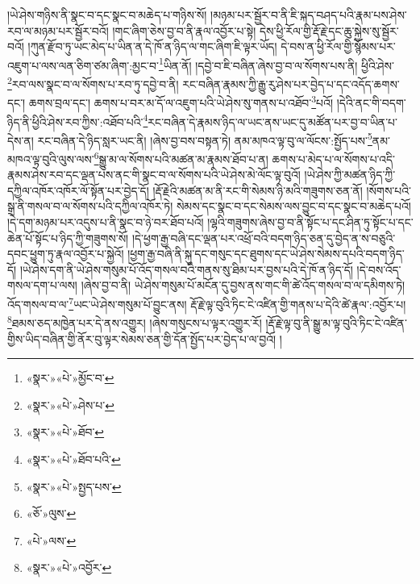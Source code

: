 །ཡེ་ཤེས་གཉིས་ནི་སྣང་བ་དང་སྣང་བ་མཆེད་པ་གཉིས་སོ། །མཉམ་པར་སྦྱོར་བ་ནི་ཇི་སྐད་བཤད་པའི་རྣམ་པས་ཤེས་རབ་ལ་མཉམ་པར་སྦྱོར་བའོ། །གང་ཞིག་ཅེས་བྱ་བ་ནི་རྣལ་འབྱོར་པ་སྟེ། དེས་ཕྱི་རོལ་གྱི་རྡོ་རྗེ་དང་ཆུ་སྐྱེས་སུ་སྦྱོར་བའོ། །ཀུན་རྫོབ་ཏུ་ཡང་མེད་པ་ཡིན་ན་དེ་ཁོ་ན་ཉིད་ལ་གང་ཞིག་ཇི་ལྟར་ཡོད། དེ་བས་ན་ཕྱི་རོལ་གྱི་སྙོམས་པར་འཇུག་པ་ལས་ལན་ཅིག་ཙམ་ཞིག་:མྱང་བ་\footnote{«སྣར་»«པེ་»མྱོང་བ་}ཡིན་ནོ། །དབྱེ་བ་ཇི་བཞིན་ཞེས་བྱ་བ་ལ་སོགས་པས་ནི། ཕྱིའི་ཤེས་\footnote{«སྣར་»«པེ་»ཤེས་པ་}རབ་ལས་སྣང་བ་ལ་སོགས་པ་རབ་ཏུ་དབྱེ་བ་ནི། རང་བཞིན་རྣམས་ཀྱི་རྒྱུ་རུ་ཤེས་པར་བྱེད་པ་དང་འདོད་ཆགས་དང་། ཆགས་བྲལ་དང་། ཆགས་པ་བར་མ་དོ་ལ་འཇུག་པའི་ཡེ་ཤེས་སུ་གནས་པ་འཐོབ་\footnote{«སྣར་»«པེ་»ཐོབ་}པའོ། །དེའི་ནང་གི་བདག་ཉིད་ནི་ཕྱིའི་ཤེས་རབ་ཀྱིས་:འཐོབ་པའི་\footnote{«སྣར་»«པེ་»ཐོབ་པའི་}རང་བཞིན་དེ་རྣམས་ཉིད་ལ་ཡང་ནས་ཡང་དུ་མཚོན་པར་བྱ་བ་ཡིན་པ་དེས་ན། རང་བཞིན་དེ་ཉིད་སླར་ཡང་ནི། །ཞེས་བྱ་བས་བསྟན་ཏེ། ནམ་མཁའ་ལྟ་བུ་ལ་ལོངས་:སྤྱོད་པས་\footnote{«སྣར་»«པེ་»སྤྱད་པས་}ནམ་མཁའ་ལྟ་བུའི་ལུས་ལས་\footnote{«ཅོ་»ལུས་}སྒྱུ་མ་ལ་སོགས་པའི་མཚན་མ་རྣམས་ཐོབ་པ་ན། ཆགས་པ་མེད་པ་ལ་སོགས་པ་འདི་རྣམས་ཤེས་རབ་དང་ལྡན་པས་ནང་གི་སྣང་བ་ལ་སོགས་པའི་ཡེ་ཤེས་མེ་ལོང་ལྟ་བུའོ། །ཡེ་ཤེས་ཀྱི་མཚན་ཉིད་ཀྱི་དཀྱིལ་འཁོར་འཁོར་ལོ་སྟོན་པར་བྱེད་དོ། །རྡོ་རྗེའི་མཚན་མ་ནི་རང་གི་སེམས་ཉི་མའི་གཟུགས་ཅན་ནོ། །སོགས་པའི་སྒྲ་ནི་གསལ་བ་ལ་སོགས་པའི་དཀྱིལ་འཁོར་ཏེ། སེམས་དང་སྣང་བ་དང་སེམས་ལས་བྱུང་བ་དང་སྣང་བ་མཆེད་པའོ། །དེ་དག་མཉམ་པར་འདུས་པ་ནི་སྣང་བ་ཉེ་བར་ཐོབ་པའོ། །ལྷའི་གཟུགས་ཞེས་བྱ་བ་ནི་སྟོང་པ་དང་ཤིན་ཏུ་སྟོང་པ་དང་ཆེན་པོ་སྟོང་པ་ཉིད་ཀྱི་གཟུགས་སོ། །དེ་ཕྱག་རྒྱ་བཞི་དང་ལྡན་པར་འཕྲོ་བའི་བདག་ཉིད་ཅན་དུ་བྱེད་ན་ས་བཅུའི་དབང་ཕྱུག་ཏུ་རྣལ་འབྱོར་པ་སྐྱེའོ། །ཕྱག་རྒྱ་བཞི་ནི་སྐུ་དང་གསུང་དང་ཐུགས་དང་ཡེ་ཤེས་སེམས་དཔའི་བདག་ཉིད་དོ། །ཡེ་ཤེས་དག་ནི་ཡེ་ཤེས་གསུམ་པོ་འོད་གསལ་བའི་གནས་སུ་ཐིམ་པར་བྱས་པའི་དེ་ཁོ་ན་ཉིད་དོ། །དེ་བས་འོད་གསལ་དག་པ་ལས། །ཞེས་བྱ་བ་ནི། ཡེ་ཤེས་གསུམ་པོ་མངོན་དུ་བྱས་ནས་གང་གི་ཚེ་འོད་གསལ་བ་ལ་དམིགས་ཏེ། འོད་གསལ་བ་ལ་\footnote{«པེ་»ལས་}ཡང་ཡེ་ཤེས་གསུམ་པོ་བྱུང་ནས། རྡོ་རྗེ་ལྟ་བུའི་ཏིང་ངེ་འཛིན་གྱི་གནས་པ་དེའི་ཚེ་རྣལ་:འབྱོར་པ། \footnote{«སྣར་»«པེ་»འབྱོར་}ཐམས་ཅད་མཁྱེན་པར་དེ་ནས་འགྱུར། །ཞེས་གསུངས་པ་ལྟར་འགྱུར་རོ། །རྡོ་རྗེ་ལྟ་བུ་ནི་སྒྱུ་མ་ལྟ་བུའི་ཏིང་ངེ་འཛིན་གྱིས་ཡིད་བཞིན་གྱི་ནོར་བུ་ལྟར་སེམས་ཅན་གྱི་དོན་སྤྱོད་པར་བྱེད་པ་ལ་བྱའོ། །

